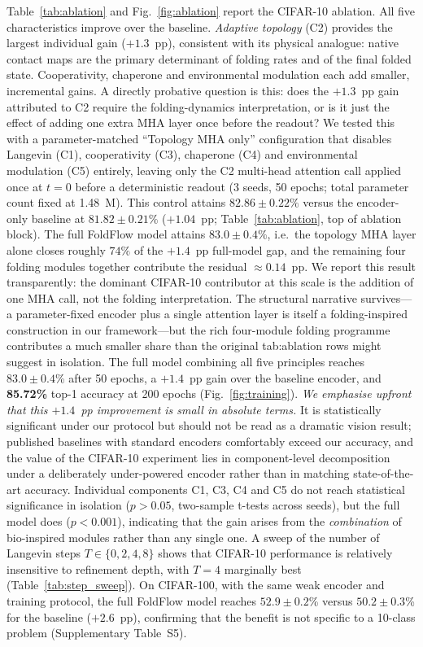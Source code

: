 \documentclass[fleqn,10pt]{article}
\begin{document}
Table~\ref{tab:ablation} and Fig.~\ref{fig:ablation} report the
CIFAR-10 ablation. All five characteristics improve over the
baseline. \emph{Adaptive topology} (C2) provides the largest
individual gain ($+1.3$~pp), consistent with its physical analogue:
native contact maps are the primary determinant of folding rates and
of the final folded state.\cite{dill2012protein} Cooperativity,
chaperone and environmental modulation each add smaller, incremental
gains. A directly probative question is this: does the
$+1.3$~pp gain attributed to C2 require the folding-dynamics
interpretation, or is it just the effect of adding one extra MHA
layer once before the readout? We tested this with a parameter-matched
``Topology MHA only'' configuration that disables Langevin (C1),
cooperativity (C3), chaperone (C4) and environmental modulation
(C5) entirely, leaving only the C2 multi-head attention call applied
once at $t{=}0$ before a deterministic readout (3 seeds, 50 epochs;
total parameter count fixed at 1.48~M). This control attains
$82.86 \pm 0.22\%$ versus the encoder-only baseline at
$81.82 \pm 0.21\%$ ($+1.04$~pp; Table~\ref{tab:ablation}, top of
ablation block). The full FoldFlow model attains $83.0 \pm 0.4\%$,
i.e.\ the topology MHA layer alone closes roughly $74\%$ of the
$+1.4$~pp full-model gap, and the remaining four folding modules
together contribute the residual $\approx 0.14$~pp. We report this
result transparently: the dominant CIFAR-10 contributor at this
scale is the addition of one MHA call, not the folding interpretation.
The structural narrative survives---a parameter-fixed encoder plus
a single attention layer is itself a folding-inspired construction
in our framework---but the rich four-module folding programme
contributes a much smaller share than the original tab:ablation
rows might suggest in isolation. The full model combining all five principles reaches
$83.0 \pm 0.4$\% after 50 epochs, a $+1.4$~pp gain over the
baseline encoder, and \textbf{85.72\%} top-1 accuracy at 200 epochs
(Fig.~\ref{fig:training}). \emph{We emphasise upfront that this
$+1.4$~pp improvement is small in absolute terms.} It is
statistically significant under our protocol but should not be read
as a dramatic vision result; published baselines with standard
encoders comfortably exceed our accuracy, and the value of the
CIFAR-10 experiment lies in component-level decomposition under a
deliberately under-powered encoder rather than in matching
state-of-the-art accuracy. Individual components C1, C3, C4 and
C5 do not reach statistical significance in isolation ($p>0.05$, two-sample
t-tests across seeds), but the full model does
($p<0.001$), indicating that the gain arises from the \emph{combination}
of bio-inspired modules rather than any single one. A sweep of the
number of Langevin steps $T \in \{0, 2, 4, 8\}$ shows that CIFAR-10
performance is relatively insensitive to refinement depth, with
$T{=}4$ marginally best (Table~\ref{tab:step_sweep}). On CIFAR-100,
with the same weak encoder and training protocol, the full FoldFlow
model reaches $52.9 \pm 0.2$\% versus $50.2 \pm 0.3$\% for the
baseline ($+2.6$~pp), confirming that the benefit is not specific to
a 10-class problem (Supplementary Table~S5).
\end{document}
